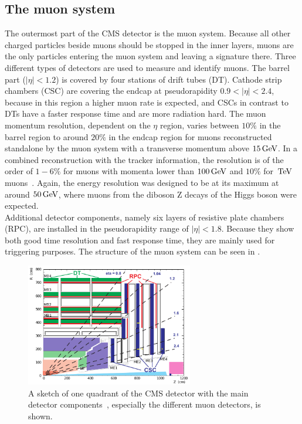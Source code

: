 \subsection{The muon system}
The outermost part of the CMS detector is the muon system. Because all other charged particles beside muons should be stopped in the inner layers, muons are the only particles entering the muon system and leaving a signature there. Three different types of detectors are used to measure and identify muons. The barrel part ($|\eta|<1.2$) is covered by four stations of drift tubes (DT). Cathode strip chambers (CSC) are covering the endcap at pseudorapidity $0.9<|\eta|<2.4$, because in this region a higher muon rate is expected, and CSCs in contrast to DTs have a faster response time and are more radiation hard.
The muon momentum resolution, dependent on the $\eta$ region, varies between $10\%$ in the barrel region to around $20\%$ in the endcap region for muons reconstructed standalone by the muon system with a transverse momentum above $15\,\text{Ge\hspace{-.08em}V}$. In a combined reconstruction with the tracker information, the resolution is of the order of $1-6\%$ for muons with momenta lower than $100\,\text{Ge\hspace{-.08em}V}$ and $10\%$ for $\,\text{Te\hspace{-.08em}V}$ muons~\cite{MuonPerformance}. Again, the energy resolution was designed to be at its maximum at around $50\,\text{Ge\hspace{-.08em}V}$, where muons from the diboson Z decays of the Higgs boson were expected.\\
Additional detector components, namely six layers of resistive plate chambers (RPC), are installed in the pseudorapidity range of $|\eta|<1.8$. Because they show both good time resolution and fast response time, they are mainly used for triggering purposes. The structure of the muon system can be seen in .
\begin{figure}[tbp]
 \centering
 \includegraphics[width=0.65\textwidth]{figures/general/muonChamber}
 \caption{A sketch of one quadrant of the CMS detector with the main detector components~\cite{CMSTDR}, especially the different muon detectors, is shown.}
 \label{fig:etaPlaneCMSTotal}
\end{figure}
